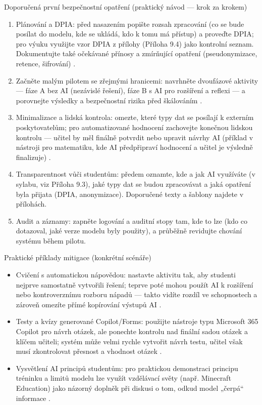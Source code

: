 \documentclass{report}%
\begin{document}
Doporučená první bezpečnostní opatření (praktický návod — krok za krokem)
\begin{enumerate}
  \item Plánování a DPIA: před nasazením popište rozsah zpracování (co se bude posílat do modelu, kde se ukládá, kdo k tomu má přístup) a proveďte DPIA; pro výuku využijte vzor DPIA z přílohy (Příloha 9.4) jako kontrolní seznam. Dokumentujte také očekávané přínosy a zmírňující opatření (pseudonymizace, retence, šifrování) \cite{kb_malinka_chatgpt_ve_vyuce_dva_roky_pote_2024_pdf_90bc3aaf_page_12_1}.
  \item Začněte malým pilotem se zřejmými hranicemi: navrhněte dvoufázové aktivity — fáze A bez AI (nezávislé řešení), fáze B s AI pro rozšíření a reflexi — a porovnejte výsledky a bezpečnostní rizika před škálováním \cite{kb_malinka_chatgpt_ve_vyuce_dva_roky_pote_2024_pdf_90bc3aaf_page_12_1}.
  \item Minimalizace a lidská kontrola: omezte, které typy dat se posílají k externím poskytovatelům; pro automatizované hodnocení zachovejte konečnou lidskou kontrolu — učitel by měl finálně potvrdit nebo upravit návrhy AI (příklad v nástroji pro matematiku, kde AI předpřipraví hodnocení a učitel je výsledně finalizuje) \cite{kb_ai_101_tipu_pdf_04e4a115_page_8_1}.
  \item Transparentnost vůči studentům: předem oznamte, kde a jak AI využíváte (v sylabu, viz Příloha 9.3), jaké typy dat se budou zpracovávat a jaká opatření byla přijata (DPIA, anonymizace). Doporučené texty a šablony najdete v přílohách.
  \item Audit a záznamy: zapněte logování a auditní stopy tam, kde to lze (kdo co dotazoval, jaké verze modelu byly použity), a průběžně revidujte chování systému během pilotu.
\end{enumerate}

Praktické příklady mitigace (konkrétní scénáře)
\begin{itemize}
  \item Cvičení s automatickou nápovědou: nastavte aktivitu tak, aby studenti nejprve samostatně vytvořili řešení; teprve poté mohou použít AI k rozšíření nebo kontroverznímu rozboru nápadů — takto vidíte rozdíl ve schopnostech a zároveň omezíte přímé kopírování výstupů AI \cite{kb_malinka_chatgpt_ve_vyuce_dva_roky_pote_2024_pdf_90bc3aaf_page_12_1}.
  \item Testy a kvízy generované Copilot/Forms: použijte nástroje typu Microsoft 365 Copilot pro návrh otázek, ale ponechte kontrolu nad finální sadou otázek a klíčem učiteli; systém může velmi rychle vytvořit návrh testu, učitel však musí zkontrolovat přesnost a vhodnost otázek \cite{kb_ai_101_tipu_pdf_04e4a115_page_36_1}.
  \item Vysvětlení AI principů studentům: pro praktickou demonstraci principu tréninku a limitů modelu lze využít vzdělávací světy (např. Minecraft Education) jako názorný doplněk při diskusi o tom, odkud model „čerpá“ informace \cite{kb_ai_101_tipu_pdf_04e4a115_page_15_2}.
\end{itemize}
\end{document}
